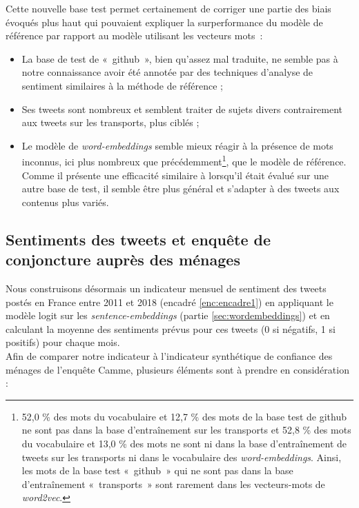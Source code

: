 \documentclass[11pt,french,french]{article}
\let\rmarkdownfootnote\footnote%
\def\footnote{\protect\rmarkdownfootnote}
\begin{document}
Cette nouvelle base test permet certainement de corriger une partie des
biais évoqués plus haut qui pouvaient expliquer la surperformance du
modèle de référence par rapport au modèle utilisant les vecteurs mots~:

\begin{itemize}
\item
  La base de test de «~github~», bien qu'assez mal traduite, ne semble
  pas à notre connaissance avoir été annotée par des techniques
  d'analyse de sentiment similaires à la méthode de référence ;
\item
  Ses tweets sont nombreux et semblent traiter de sujets divers
  contrairement aux tweets sur les transports, plus ciblés ;
\item
  Le modèle de \emph{word-embeddings} semble mieux réagir à la présence
  de mots inconnus, ici plus nombreux que précédemment\footnote{52,0 \%
    des mots du vocabulaire et 12,7 \% des mots de la base test de
    github ne sont pas dans la base d'entraînement sur les transports et
    52,8 \% des mots du vocabulaire et 13,0 \% des mots ne sont ni dans
    la base d'entraînement de tweets sur les transports ni dans le
    vocabulaire des \emph{word-embeddings}. Ainsi, les mots de la base
    test «~github~» qui ne sont pas dans la base d'entraînement
    «~transports~» sont rarement dans les vecteurs-mots de
    \emph{word2vec}.}, que le modèle de référence. Comme il présente une
  efficacité similaire à lorsqu'il était évalué sur une autre base de
  test, il semble être plus général et s'adapter à des tweets aux
  contenus plus variés.
\end{itemize}

\subsection{Sentiments des tweets et enquête de conjoncture auprès des
ménages}\label{sec:camme}

Nous construisons désormais un indicateur mensuel de sentiment des
tweets postés en France entre 2011 et 2018 (encadré \ref{enc:encadre1})
en appliquant le modèle logit sur les \emph{sentence-embeddings} (partie
\ref{sec:wordembeddings}) et en calculant la moyenne des sentiments
prévus pour ces tweets (0 si négatifs, 1 si positifs) pour chaque
mois.\\
Afin de comparer notre indicateur à l'indicateur synthétique de
confiance des ménages de l'enquête Camme, plusieurs éléments sont à
prendre en considération :
\end{document}
